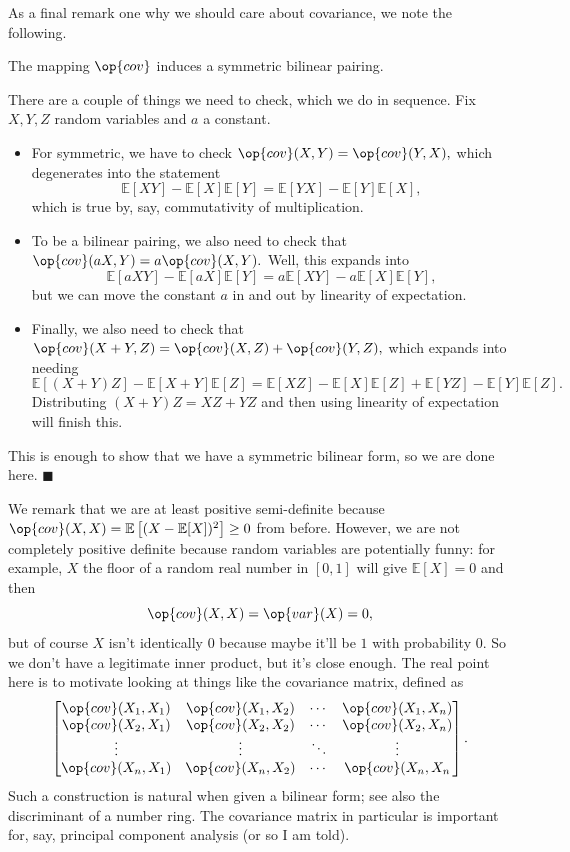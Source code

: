 As a final remark one why we should care about covariance, we note the following.
\begin{proposition}
    The mapping $\op{cov}$ induces a symmetric bilinear pairing.
\end{proposition}
There are a couple of things we need to check, which we do in sequence. Fix $X,Y,Z$ random variables and $a$ a constant.
\begin{itemize}
    \item For symmetric, we have to check $\op{cov}(X,Y)=\op{cov}(Y,X),$ which degenerates into the statement
    \[\mathbb E[XY]-\mathbb E[X]\mathbb E[Y]=\mathbb E[YX]-\mathbb E[Y]\mathbb E[X],\]
    which is true by, say, commutativity of multiplication.
    \item To be a bilinear pairing, we also need to check that $\op{cov}(aX,Y)=a\op{cov}(X,Y).$ Well, this expands into
    \[\mathbb E[aXY]-\mathbb E[aX]\mathbb E[Y]=a\mathbb E[XY]-a\mathbb E[X]\mathbb E[Y],\]
    but we can move the constant $a$ in and out by linearity of expectation.
    \item Finally, we also need to check that $\op{cov}(X+Y,Z)=\op{cov}(X,Z)+\op{cov}(Y,Z),$ which expands into needing
    \[\mathbb E[(X+Y)Z]-\mathbb E[X+Y]\mathbb E[Z]=\mathbb E[XZ]-\mathbb E[X]\mathbb E[Z]+\mathbb E[YZ]-\mathbb E[Y]\mathbb E[Z].\]
    Distributing $(X+Y)Z=XZ+YZ$ and then using linearity of expectation will finish this.
\end{itemize}
This is enough to show that we have a symmetric bilinear form, so we are done here. $\blacksquare$

We remark that we are at least positive semi-definite because $\op{cov}(X,X)=\mathbb E\left[(X-\mathbb E[X])^2\right]\ge0$ from before. However, we are not completely positive definite because random variables are potentially funny: for example, $X$ the floor of a random real number in $[0,1]$ will give $\mathbb E[X]=0$ and then
\[\op{cov}(X,X)=\op{var}(X)=0,\]
but of course $X$ isn't identically $0$ because maybe it'll be $1$ with probability $0.$ So we don't have a legitimate inner product, but it's close enough. The real point here is to motivate looking at things like the covariance matrix, defined as
\[\begin{bmatrix}
    \op{cov}(X_1,X_1) & \op{cov}(X_1,X_2) & \cdots & \op{cov}(X_1,X_n) \\
    \op{cov}(X_2,X_1) & \op{cov}(X_2,X_2) & \cdots & \op{cov}(X_2,X_n) \\
    \vdots & \vdots & \ddots & \vdots \\
    \op{cov}(X_n,X_1) & \op{cov}(X_n,X_2) & \cdots & \op{cov}(X_n,X_n
\end{bmatrix}.\]
Such a construction is natural when given a bilinear form; see also the discriminant of a number ring. The covariance matrix in particular is important for, say, principal component analysis (or so I am told).

